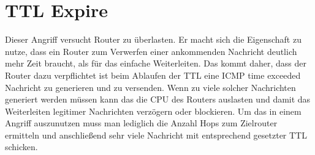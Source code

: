 \section{TTL Expire}

Dieser Angriff versucht Router zu überlasten. Er macht sich die Eigenschaft zu nutze, dass ein Router zum Verwerfen einer ankommenden Nachricht deutlich mehr Zeit braucht, als für das einfache Weiterleiten. Das kommt daher, dass der Router dazu verpflichtet ist beim Ablaufen der TTL eine ICMP time exceeded Nachricht zu generieren und zu versenden. Wenn zu viele solcher Nachrichten generiert werden müssen kann das die CPU des Routers auslasten und damit das Weiterleiten legitimer Nachrichten verzögern oder blockieren. Um das in einem Angriff auszunutzen muss man lediglich die Anzahl Hops zum Zielrouter ermitteln und anschließend sehr viele Nachricht mit entsprechend gesetzter TTL schicken.